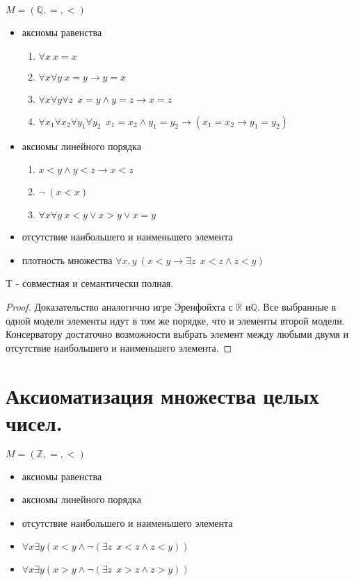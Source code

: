 \documentclass{article}
\begin{document}
$M = ( \mathbb{Q}, =, <)$
\begin{itemize}
    \item аксиомы равенства
    \begin{enumerate}
        \item $\forall x \: x = x$
        \item $\forall x \forall y \: x = y \rightarrow y = x$
        \item $\forall x \forall y \forall z \: \: x = y \land y = z \rightarrow x = z$
        \item $\forall x_1 \forall x_2 \forall y_1 \forall y_2 \: \: x_1 = x_2 \land y_1 = y_2 \rightarrow (x_1 = x_2 \rightarrow y_1 = y_2)$
    \end{enumerate}
    \item аксиомы линейного порядка
    \begin{enumerate}
        \item $x < y \land y < z \rightarrow x < z$
        \item $\neg \: (x < x)$
        \item $\forall x \forall y \: x < y \lor x > y \lor x = y$
    \end{enumerate}
    \item отсутствие наибольшего и наименьшего элемента
    \item плотность множества $\forall x, y \: (x < y \rightarrow \exists z \: \:  x < z \land z < y)$
\end{itemize}

\begin{theorem}{T - совместная и семантически полная.}
\begin{proof}
Доказательство аналогично игре Эренфойхта с $\mathbb{R}$ и$\mathbb{Q}$. Все выбранные в одной модели элементы идут в том же порядке, что и элементы второй модели. Консерватору достаточно возможности выбрать элемент между любыми двумя и отсутствие наибольшего и наименьшего элемента.
\end{proof}
\end{theorem}

\setcounter{section}{27}
\section{Аксиоматизация множества целых чисел.}

$M = (\mathbb{Z}, =, <)$
\begin{itemize}
    \item аксиомы равенства
    \item аксиомы линейного порядка
    \item отсутствие наибольшего и наименьшего элемента
    \item $\forall x \exists y (x < y \land \neg (\exists z \: \: x < z \land z < y))$
    \item $\forall x \exists y (x > y \land \neg (\exists z \: \: x > z \land z > y))$
\end{itemize}
\end{document}
